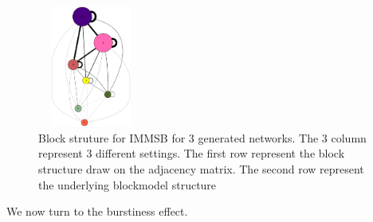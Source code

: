 \begin{figure}[h]
	\endminipage
	\includegraphics[width=3.5cm, height=4cm]{img/M_g_regular/graph_dot}
	\endminipage
	\caption{Block struture for IMMSB for 3 generated networks. The 3 column represent 3 different settings. The first row represent the block structure draw on the adjacency matrix. The second row represent the underlying blockmodel structure }
	\label{fig:gen_blocks_mmsb}
\end{figure}


 We now turn to the burstiness effect.
